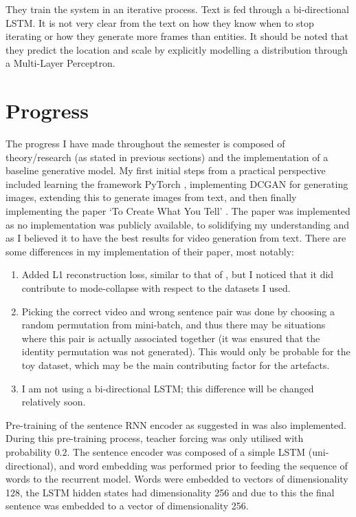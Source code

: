 \documentclass{article}
\begin{document}
They train the system in an iterative process. Text is fed through a bi-directional LSTM. It is not very clear from the text on how they know when to stop iterating or how they generate more frames than entities. It should be noted
that they predict the location and scale by explicitly modelling a distribution through a Multi-Layer Perceptron.

\section{Progress}

The progress I have made throughout the semester is composed of theory/research (as stated in previous sections) and the implementation of a baseline generative model. My first
initial steps from a practical perspective included learning the framework
PyTorch \cite{paszke_automatic_2017}, implementing DCGAN \cite{radford_unsupervised_2015} for generating images, extending this to generate images from text, and then 
finally implementing the paper `To Create What You Tell' \cite{pan_create_2018}. The paper was implemented as no implementation was 
publicly available, to solidifying my understanding and as I believed it to have the best results for video generation from text. There are some differences in my implementation of their paper, most notably:

\begin{enumerate}
    \item Added L1 reconstruction loss, similar to that of \cite{li_video_2017}, but I noticed that it did contribute to mode-collapse with respect to the datasets I used. 
    \item Picking the correct video and wrong sentence pair was done by choosing a random permutation from mini-batch, and thus there may be situations where this pair is actually associated together (it was ensured
        that the identity permutation was not generated). This
        would only be probable for the toy dataset, which may be the main contributing factor for the artefacts.
    \item I am not using a bi-directional LSTM; this difference will be changed relatively soon.
\end{enumerate}

Pre-training of the sentence RNN encoder \cite{dai_semi-supervised_2015} as suggested in \cite{pan_create_2018}
was also implemented. During this pre-training process, teacher forcing was only
utilised with probability $0.2$. The sentence encoder was composed of a simple LSTM (uni-directional), and 
word embedding was performed prior to feeding the sequence of words to the recurrent model. Words were embedded to 
vectors of dimensionality 128, the LSTM hidden states had dimensionality 256 and due to this the final sentence was embedded to a vector
of dimensionality 256.
\end{document}
